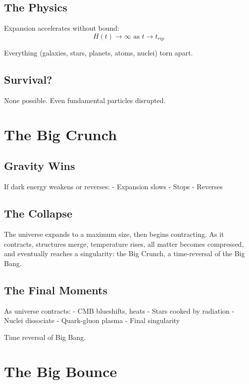 \documentclass[
  11pt,
  letterpaper,
  twoside,
  openright]{book}
\begin{document}
\subsection{The Physics}\label{the-physics}

Expansion accelerates without bound: \[
H(t) \rightarrow \infty \text{ as } t \rightarrow t_{rip}
\]

Everything (galaxies, stars, planets, atoms, nuclei) torn apart.

\subsection{Survival?}\label{survival}

None possible. Even fundamental particles disrupted.

\section{The Big Crunch}\label{the-big-crunch}

\subsection{Gravity Wins}\label{gravity-wins}

If dark energy weakens or reverses: - Expansion slows - Stops - Reverses

\subsection{The Collapse}\label{the-collapse}

The universe expands to a maximum size, then begins contracting. As it
contracts, structures merge, temperature rises, all matter becomes
compressed, and eventually reaches a singularity: the Big Crunch, a
time-reversal of the Big Bang.

\subsection{The Final Moments}\label{the-final-moments}

As universe contracts: - CMB blueshifts, heats - Stars cooked by
radiation - Nuclei dissociate - Quark-gluon plasma - Final singularity

Time reversal of Big Bang.

\section{The Big Bounce}\label{the-big-bounce}
\end{document}
